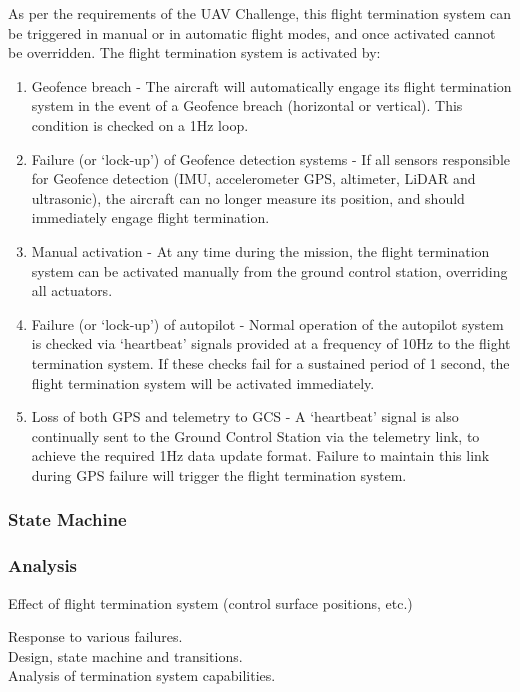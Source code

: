 As per the requirements of the UAV Challenge, this flight termination system can be triggered in manual or in automatic flight modes, and once activated cannot be overridden. The flight termination system is activated by:
\begin{enumerate}
	\item Geofence breach - The aircraft will automatically engage its flight termination system in the event of a Geofence breach (horizontal or vertical). This condition is checked on a 1Hz loop.
	\item Failure (or ‘lock-up’) of Geofence detection systems - If all sensors responsible for Geofence detection (IMU, accelerometer GPS, altimeter, LiDAR and ultrasonic), the aircraft can no longer measure its position, and should immediately engage flight termination.
	\item Manual activation - At any time during the mission, the flight termination system can be activated manually from the ground control station, overriding all actuators.
	\item Failure (or ‘lock-up’) of autopilot - Normal operation of the autopilot system is checked via ‘heartbeat’ signals provided at a frequency of 10Hz to the flight termination system. If these checks fail for a sustained period of 1 second, the flight termination system will be activated immediately.
	\item Loss of both GPS and telemetry to GCS - A ‘heartbeat’ signal is also continually sent to the Ground Control Station via the telemetry link, to achieve the required 1Hz data update format. Failure to maintain this link during GPS failure will trigger the flight termination system.
\end{enumerate}

\subsubsection{State Machine}

\subsubsection{Analysis}
Effect of flight termination system (control surface positions, etc.)

Response to various failures.\\

Design, state machine and transitions.\\

Analysis of termination system capabilities.

